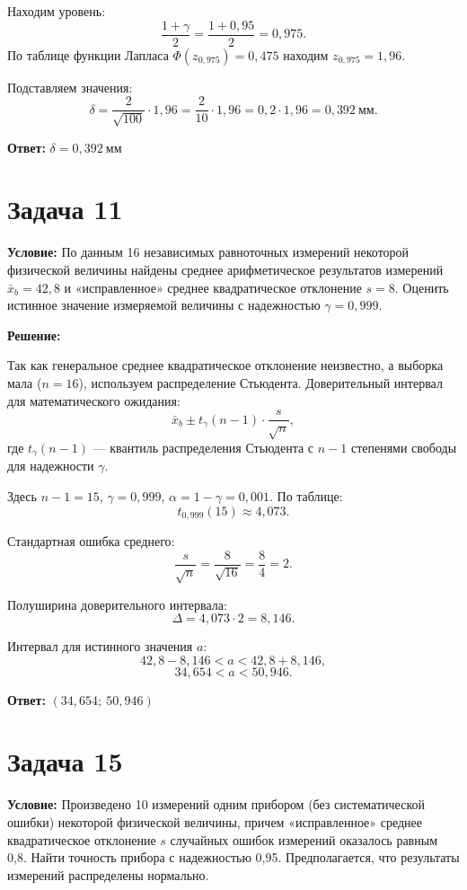 \documentclass[a4paper,14pt]{article}
\begin{document}
Находим уровень:
\[
\frac{1+\gamma}{2} = \frac{1+0{,}95}{2} = 0{,}975.
\]
По таблице функции Лапласа \( \Phi(z_{0{,}975}) = 0{,}475 \) находим \( z_{0{,}975} = 1{,}96 \).

Подставляем значения:
\[
\delta = \frac{2}{\sqrt{100}} \cdot 1{,}96 = \frac{2}{10} \cdot 1{,}96 = 0{,}2 \cdot 1{,}96 = 0{,}392 \ \text{мм}.
\]

\textbf{Ответ:} \( \boxed{\delta = 0{,}392 \ \text{мм}} \)

\vspace{1cm}

\section*{Задача 11}
\textbf{Условие:}
По данным 16 независимых равноточных измерений некоторой физической величины найдены среднее арифметическое результатов измерений \( \bar{x}_b = 42{,}8 \) и «исправленное» среднее квадратическое отклонение \( s = 8 \). Оценить истинное значение измеряемой величины с надежностью \( \gamma = 0{,}999 \).

\textbf{Решение:}

Так как генеральное среднее квадратическое отклонение неизвестно, а выборка мала (\( n = 16 \)), используем распределение Стьюдента. Доверительный интервал для математического ожидания:
\[
\bar{x}_b \pm t_{\gamma}(n-1) \cdot \frac{s}{\sqrt{n}},
\]
где \( t_{\gamma}(n-1) \) — квантиль распределения Стьюдента с \( n-1 \) степенями свободы для надежности \( \gamma \).

Здесь \( n-1 = 15 \), \( \gamma = 0{,}999 \), \( \alpha = 1 - \gamma = 0{,}001 \). По таблице:
\[
t_{0{,}999}(15) \approx 4{,}073.
\]

Стандартная ошибка среднего:
\[
\frac{s}{\sqrt{n}} = \frac{8}{\sqrt{16}} = \frac{8}{4} = 2.
\]

Полуширина доверительного интервала:
\[
\Delta = 4{,}073 \cdot 2 = 8{,}146.
\]

Интервал для истинного значения \( a \):
\[
42{,}8 - 8{,}146 < a < 42{,}8 + 8{,}146,
\]
\[
34{,}654 < a < 50{,}946.
\]

\textbf{Ответ:} \( \boxed{(34{,}654; \ 50{,}946)} \)

\vspace{1cm}

\section*{Задача 15}
\textbf{Условие:}
Произведено 10 измерений одним прибором (без систематической ошибки) некоторой физической величины, причем «исправленное» среднее квадратическое отклонение \( s \) случайных ошибок измерений оказалось равным 0,8. Найти точность прибора с надежностью 0,95. Предполагается, что результаты измерений распределены нормально.
\end{document}
